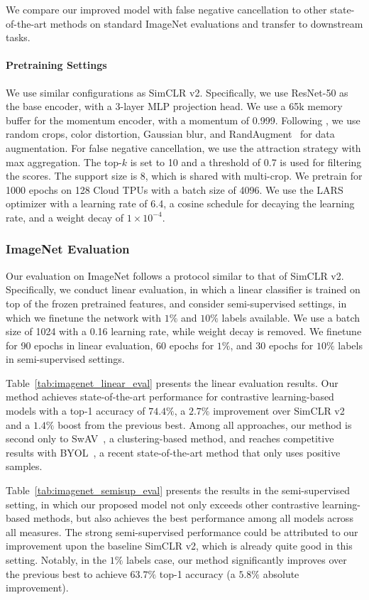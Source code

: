 \documentclass[10pt,twocolumn,letterpaper]{article}
\begin{document}
We compare our improved model with false negative cancellation to other state-of-the-art methods on standard ImageNet evaluations and transfer to downstream tasks.

\paragraph{Pretraining Settings} We use similar configurations as SimCLR v2. Specifically, we use ResNet-50 as the base encoder, with a 3-layer MLP projection head. We use a 65k memory buffer for the momentum encoder, with a momentum of 0.999. Following \citet{tian2020what}, we use random crops, color distortion, Gaussian blur, and RandAugment~\cite{cubuk2019randaugment} 
for data augmentation. For false negative cancellation, we use the attraction strategy with max aggregation. The top-$k$ is set to 10 and a threshold of 0.7 is used for filtering the scores. The support size is 8, which is shared with multi-crop. We pretrain for 1000 epochs on 128 Cloud TPUs with a batch size of 4096. We use the LARS optimizer with a learning rate of 6.4, a cosine schedule for decaying the learning rate, and a weight decay of $1  \times 10^{-4}$.
\subsubsection{ImageNet Evaluation}

Our evaluation on ImageNet follows a protocol similar to that of SimCLR v2. Specifically, we conduct linear evaluation, in which a linear classifier is trained on top of the frozen pretrained features, and consider semi-supervised settings, in which we finetune the network with $1\%$ and $10\%$ labels available. We use a batch size of 1024 with a 0.16 learning rate, while weight decay is removed. We finetune for 90 epochs in linear evaluation, 60 epochs for $1\%$, and 30 epochs for $10\%$ labels in semi-supervised settings.

Table~\ref{tab:imagenet_linear_eval} presents the linear evaluation results. Our method achieves state-of-the-art performance for contrastive learning-based models with a top-1 accuracy of $74.4\%$, a $2.7\%$ improvement over SimCLR v2 and a $1.4\%$ boost from the previous best. Among all approaches, our method is second only to SwAV~\cite{caron2020unsupervised}, a clustering-based method, and reaches competitive results with BYOL~\cite{grill2020bootstrap}, a recent state-of-the-art method that only uses positive samples.

Table~\ref{tab:imagenet_semisup_eval} presents the results in the semi-supervised setting, in which our proposed model not only exceeds other contrastive learning-based methods, but also achieves the best performance among all models across all measures. The strong semi-supervised performance could be attributed to our improvement upon the baseline SimCLR v2, which is already quite good in this setting. Notably, in the $1\%$ labels case, our method significantly improves over the previous best to achieve $63.7\%$ top-1 accuracy (a $5.8\%$ absolute improvement).
\end{document}

